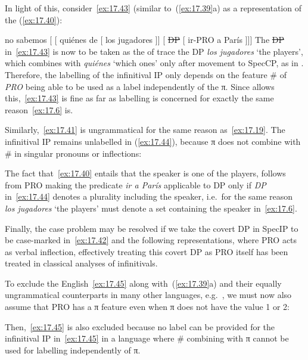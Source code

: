 \documentclass[output=paper]{langsci/langscibook}
\begin{document}
In light of this, consider~\eqref{ex:17.43} (similar
to~(\ref{ex:17.39}a) as a representation of the 
(\ref{ex:17.40}):

\ea\label{ex:17.43}
    no sabemos\tss{\Fpl} [ [ quiénes de [  los jugadores ]] [ \sout{DP} [ ir-PRO\tss{\Fpl} a París ]]]
\z
The \sout{DP} in~\eqref{ex:17.43} is now to be taken as the of trace the DP
\emph{los jugadores} ‘the players’, which combines with \emph{quiénes} ‘which
ones’ only after movement to SpecCP, as in \citet{Sportiche2005}.  Therefore,
the labelling of the infinitival IP only depends on the feature
\# of \emph{PRO}\tss{\Fpl} being able to be used as a label independently of
the π. Since  allows this,~\eqref{ex:17.43} is fine as far as
labelling is concerned for exactly the same
reason~\eqref{ex:17.6} is.

Similarly,~\eqref{ex:17.41} is ungrammatical for the same reason
as~\eqref{ex:17.19}. The infinitival IP remains unlabelled in
(\ref{ex:17.44}), because π does not combine with \# in singular pronouns or
inflections:

\ea[*]{%
    no sé\tss{\Fsg} [\tss{CP} [\tss{whP} quién de [\tss{DP} los jugadores]]] [\tss{IP} \sout{DP} [\tss{IP} ir-PRO\tss{\Fsg} a París ]]]
    }\label{ex:17.44}
\z
The fact that~\eqref{ex:17.40} entails that the speaker is one of the players,
follows from PRO\tss{\Fpl} making the predicate \emph{ir a París}
applicable to DP only if \emph{DP} in~\eqref{ex:17.44} denotes a
plurality including the speaker, i.e.\ for the same reason \emph{los jugadores}
‘the players’ must denote a set containing the speaker in~\eqref{ex:17.6}.

Finally, the case problem may be resolved if we take the covert DP in SpecIP to
be case-marked in~\eqref{ex:17.42} and the following representations, where
PRO acts as verbal inflection, effectively treating this covert DP as PRO
itself has been treated in classical analyses of  infinitivals.

To exclude the English~\eqref{ex:17.45} along with~(\ref{ex:17.39}a) and their
equally ungrammatical counterparts in many other languages, e.g.\ , we
must now also assume that PRO has a π feature even when π
does not have the value 1 or 2:

\label{ex:17.45}
\z
Then,~\eqref{ex:17.45} is also excluded because no label can be provided for the
infinitival IP in~\eqref{ex:17.45} in a language where \# combining with π
cannot be used for labelling independently of π.
\end{document}
